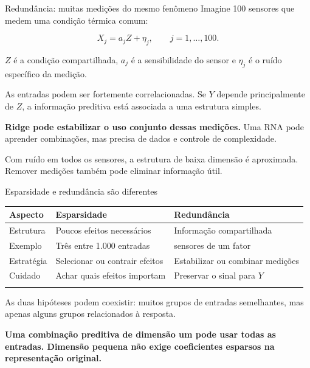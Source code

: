 \documentclass[
  10pt,
  ignorenonframetext,
  aspectratio=169,
  brazilian,
]{beamer}
\newcounter{none} %
\begin{document}
\begin{frame}{Redundância: muitas medições do mesmo fenômeno}
\protect{}\label{redunduxe2ncia-muitas-mediuxe7uxf5es-do-mesmo-fenuxf4meno}
Imagine 100 sensores que medem uma condição térmica comum:

\[
X_j=a_jZ+\eta_j,\qquad j=1,\ldots,100.
\]

\(Z\) é a condição compartilhada, \(a_j\) é a sensibilidade do sensor e
\(\eta_j\) é o ruído específico da medição.

As entradas podem ser fortemente correlacionadas. Se \(Y\) depende
principalmente de \(Z\), a informação preditiva está associada a uma
estrutura simples.

\textbf{Ridge pode estabilizar o uso conjunto dessas medições.} Uma RNA
pode aprender combinações, mas precisa de dados e controle de
complexidade.

Com ruído em todos os sensores, a estrutura de baixa dimensão é
aproximada. Remover medições também pode eliminar informação útil.
\end{frame}

\begin{frame}{Esparsidade e redundância são diferentes}
\protect{}\label{esparsidade-e-redunduxe2ncia-suxe3o-diferentes}
{\def\LTcaptype{none} %
\begin{longtable}[]{@{}
  >{\raggedright\arraybackslash}p{}
  >{\raggedright\arraybackslash}p{}
  >{\raggedright\arraybackslash}p{}@{}}
\toprule\noalign{}
\begin{minipage}[b]{\linewidth}\raggedright
Aspecto
\end{minipage} & \begin{minipage}[b]{\linewidth}\raggedright
Esparsidade
\end{minipage} & \begin{minipage}[b]{\linewidth}\raggedright
Redundância
\end{minipage} \\
\midrule\noalign{}
\endhead
Estrutura & Poucos efeitos necessários & Informação compartilhada \\
Exemplo & Três entre 1.000 entradas & 100 sensores de um fator \\
Estratégia & Selecionar ou contrair efeitos & Estabilizar ou combinar
medições \\
Cuidado & Achar quais efeitos importam & Preservar o sinal para \(Y\) \\
\bottomrule\noalign{}
\end{longtable}
}

As duas hipóteses podem coexistir: muitos grupos de entradas
semelhantes, mas apenas alguns grupos relacionados à resposta.

\textbf{Uma combinação preditiva de dimensão um pode usar todas as
entradas. Dimensão pequena não exige coeficientes esparsos na
representação original.}
\end{frame}
\end{document}
